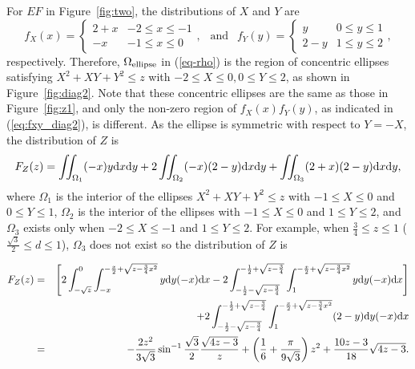 \documentclass[12pt,draftclsnofoot,onecolumn]{IEEEtran}
\begin{document}
For $EF$ in Figure~\ref{fig:two}, the distributions of $X$ and $Y$ are
\begin{equation}\label{eq:fxy_diag2}
  f_X(x)=\left\{
    \begin{array}{lr}
      2+x & -2\leq x \leq -1 \\
      -x & -1 \leq x \leq 0
    \end{array}
  \right.,
  ~~\mbox{ and }~~ f_Y(y)=\left\{
    \begin{array}{lr}
      y & 0\leq y \leq 1 \\
      2-y & 1 \leq y \leq 2
    \end{array}
  \right.,
\end{equation}
respectively.
Therefore, $\Omega_{\rm ellipse}$ in (\ref{eq-rho})
is the region of concentric ellipses satisfying $X^2+XY+Y^2 \leq z$ with $-2 \leq X \leq 0,
0\leq Y \leq 2$, as shown in Figure~\ref{fig:diag2}.
Note that these concentric ellipses are
the same as those in Figure~\ref{fig:z1}, and only the non-zero
region of $f_X(x)f_Y(y)$, as indicated in (\ref{eq:fxy_diag2}),
is different.
As the ellipse is symmetric with respect to $Y=-X$, the distribution of $Z$ is
\begin{equation}
\label{eq:fz_shortdiag}
 F_Z(z)=\iint_{\Omega_1}(-x)y{\rm d}x{\rm d}y+2\iint_{\Omega_2}(-x)(2-y){\rm
d}x{\rm d}y+\iint_{\Omega_3}(2+x)(2-y){\rm d}x{\rm d}y,
\end{equation}
where $\Omega_1$ is the interior of the ellipses $X^2+XY+Y^2 \leq z$ with $-1 \leq X
\leq 0$ and $0 \leq Y \leq 1$, $\Omega_2$ is the interior of the ellipses with
$-1 \leq X \leq 0$ and $1 \leq Y \leq 2$, and $\Omega_3$ exists only when $-2 \leq X \leq
-1$ and $1 \leq Y \leq 2$.
For example, when $\frac{3}{4} \leq z \leq 1$ ($\frac{\sqrt{3}}{2} \leq d \leq 1$),
$\Omega_3$ does not exist so the distribution of $Z$ is
\begin{small}
 \begin{eqnarray}\label{eq:Z2_r_diag2}
 F_Z(z)&=&\left[2\int_{-\sqrt{z}}^0\int_{-x}^{-\frac{x}{2}+\sqrt{z-\frac{3}{4}
x^2}}y{\rm d}y(-x){\rm
d}x-2\int_{-\frac{1}{2}-\sqrt{z-\frac{3}{4}}}^{-\frac{1}{2}+\sqrt{
z-\frac{3}{4}}}\int_1^{-\frac{x}{2}+\sqrt{z-\frac{3}{4}x^2}}y{\rm d}y(-x){\rm
d}x\right] \nonumber\\
&&+2\int_{-\frac{1}{2}-\sqrt{z-\frac{3}{4}}}^{-\frac{1}{2}+\sqrt{z-\frac{3}{4}}}
\int_1^{-\frac{x}{2}+\sqrt{z-\frac{3}{4}x^2}}(2-y){\rm d}y(-x){\rm d}x
\nonumber\\
&=&-\frac{2z^2}{3\sqrt{3}}\sin^{-1}\frac{\sqrt{3}}{2}\frac{\sqrt{4z-3}}{z}
+\left(\frac{1}{6}+\frac{\pi}{9\sqrt{3}}\right)z^2+\frac{10z-3}{18}\sqrt{4z-3}.
\end{eqnarray}
\end{small}
\end{document}
